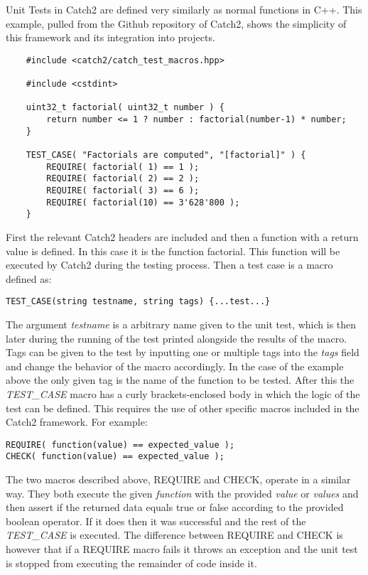 Unit Tests in Catch2 are defined very similarly as normal functions in C++. This example, pulled from the Github repository of Catch2, shows the simplicity of
this framework and its integration into projects.

\begin{verbatim}
    #include <catch2/catch_test_macros.hpp>

    #include <cstdint>
    
    uint32_t factorial( uint32_t number ) {
        return number <= 1 ? number : factorial(number-1) * number;
    }
    
    TEST_CASE( "Factorials are computed", "[factorial]" ) {
        REQUIRE( factorial( 1) == 1 );
        REQUIRE( factorial( 2) == 2 );
        REQUIRE( factorial( 3) == 6 );
        REQUIRE( factorial(10) == 3'628'800 );
    }
\end{verbatim}

First the relevant Catch2 headers are included and then a function with a return value is defined. In this case it is the function factorial. 
This function will be executed by Catch2 during the testing process. Then a test case is a macro defined as:

\begin{verbatim}
TEST_CASE(string testname, string tags) {...test...}
\end{verbatim}

The argument \textit{testname} is a arbitrary name given to the unit test, which is then later during the running of the test printed alongside the results of the macro.
Tags can be given to the test by inputting one or multiple tags into the \textit{tags} field and change the behavior of the macro accordingly. In the case of the example above
the only given tag is the name of the function to be tested. After this the \textit{TEST\_CASE} macro has a curly brackets-enclosed body in which the logic of the test can 
be defined.
This requires the use of other specific macros included in the Catch2 framework. For example:

\begin{verbatim}
REQUIRE( function(value) == expected_value );
CHECK( function(value) == expected_value );
\end{verbatim}

The two macros described above, REQUIRE and CHECK, operate in a similar way. They both execute the given \textit{function} with the provided \textit{value} or \textit{values}
and then assert if the returned data equals true or false according to the provided boolean operator. If it does then it was successful and the rest of the \textit{TEST\_CASE} is executed. The difference 
between REQUIRE and CHECK is however that if a REQUIRE macro fails it throws an exception and the unit test is stopped from executing the remainder of code inside it.

